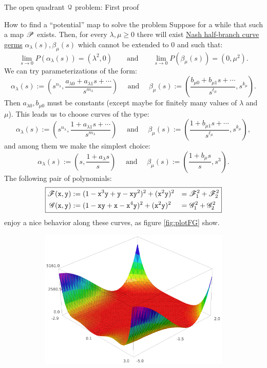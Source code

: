 \documentclass[11pt, a4paper, english, twoside, notitlepage, openright]{report}
\begin{document}
\begin{chapter}{The open quadrant $\Qu$ problem: First proof}
\begin{section}{How to find a ``potential'' map to solve the problem}
Suppose for a while that such a map $\P$ exists. Then, for every $\lambda,\mu\ge 0$ there will exist \hyperref[curveGerms]{Nash half-branch curve germs} $\alpha_{\lambda}(s),\beta_{\mu}(s)$ which cannot be extended to $0$ and such that:
$$
\lim_{s\rightarrow 0} P(\alpha_{\lambda}(s))=(\lambda^2,0)\qquad \text{and} \qquad \lim_{s\rightarrow 0} P(\beta_{\mu}(s))=(0,\mu^2).
$$
We can try parameterizations of the form:
$$
\alpha_{\lambda}(s):=\left(s^{n_{\lambda}},\frac{a_{\lambda 0}+a_{\lambda 1}s+\cdots}{s^{m_{\lambda}}}\right)
\quad \text{ and } \quad
\beta_{\mu}(s):=\left(\frac{b_{\mu 0}+b_{\mu 1}s+\cdots}{s^{\ell_{\mu}}},s^{k_{\mu}}\right).
$$
Then $a_{\lambda 0},b_{\mu 0}$ must be constants (except maybe for finitely many values of $\lambda$ and $\mu$). This leads us to choose curves of the type:
$$
\alpha_{\lambda}(s):=\left(s^{n_{\lambda}},\frac{1+a_{\lambda 1}s+\cdots}{s^{m_{\lambda}}}\right)
\quad \text{ and } \quad
\beta_{\mu}(s):=\left(\frac{1+b_{\mu 1}s+\cdots}{s^{\ell_{\mu}}},s^{k_{\mu}}\right),
$$
and among them we make the simplest choice: 
$$
\alpha_{\lambda}(s):=\left(s,\frac{1+a_{\lambda }s}{s}\right)
\quad \text{ and } \quad
\beta_{\mu}(s):=\left(\frac{1+b_{\mu }s}{s},s^{3}\right).
$$
The following pair of polynomials:
\begin{equation*}\label{eq:firstMap}
\boxed{
\begin{aligned}
\F({\tt x},{\tt y})&:=(1-{\tt x}^3{\tt y}+{\tt y}-{\tt x}{\tt y}^2)^2+({\tt x}^2{\tt y})^2&=&\ \F_1^2+\F_2^2 \\
\G({\tt x},{\tt y})&:=(1-{\tt x}{\tt y}+{\tt x}-{\tt x}^4{\tt y})^2+({\tt x}^2{\tt y})^2&=&\ \G_1^2+\G_2^2\\
\end{aligned}
}
\end{equation*}
enjoy a nice behavior along these curves, as figure \ref{fig:plotFG} show.
\begin{figure}[h]\hspace{-0.15cm}
\begin{subfigure}{.49\linewidth}\centering
\includegraphics[width=1\textwidth]{plots/ch1_04_F.png}

\end{subfigure}
\end{figure}
\end{section}
\end{chapter}
\end{document}
